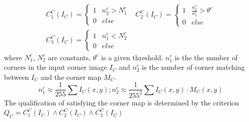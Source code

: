 \begin{equation}
  \begin{array}{rcl}
   C_1^C(I_C) = \left\{ 
    \begin{array}{rcl}
    1 & n_2^c > N_1^c \\
    0 & else
    \end{array}\right. &   
   C_2^C(I_C) = \left\{ 
    \begin{array}{rcl}
    1 &  \frac{n_2^c}{n_1^c} > \theta^c \\
    0 & else
    \end{array}\right.  \\  
   C_3^C(I_C) = \left\{ 
    \begin{array}{rcl}
    1 & n_1^c < N_2^c \\
    0 & else
   \end{array}\right.  & 
   \mbox{~~~~}
  \end{array}
  \label{eq:corner_map_satisfy}
\end{equation}
where $N_1^c$, $N_2^c$ are constants, $\theta^c$ is a given threshold. $n_1^c$ is the 
the number of corners in the input corner image $I_C$ and $n_2^c$ is the number
of corner matching between $I_C$ and the corner map $M_C$.
\begin{equation}
 n_1^c \approx \frac{1}{255} \sum I_C(x,y);
 \mbox{}
 n_2^c \approx \frac{1}{255^2} \sum I_C(x,y)\cdot M_C(x,y)
   \label{eq:n_1_e_and_n_2_e}
\end{equation}
The qualification of satisfying the corner map is determined by the criterion $Q_C = C_1^C(I_C) \wedge C_2^C(I_C) \wedge C_3^C(I_C)$

